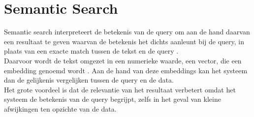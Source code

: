 \section{Semantic Search}
Semantic search interpreteert de betekenis van de query om aan de hand daarvan een resultaat te geven waarvan de betekenis het dichts aanleunt bij de query, in plaats van een exacte match tussen de tekst en de query \autocite{Bast2016}.\\
Daarvoor wordt de tekst omgezet in een numerieke waarde, een vector, die een embedding genoemd wordt
\autocite{Almeida2019}. Aan de hand van deze embeddings kan het systeem dan de gelijkenis vergelijken tussen de query en de data.\\
Het grote voordeel is dat de relevantie van het resultaat verbetert omdat het systeem de betekenis van de query begrijpt, zelfs in het geval van kleine afwijkingen ten opzichte van de data. 




